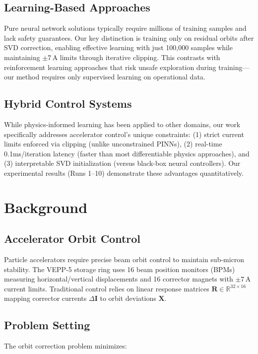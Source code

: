 \documentclass{article} %
\begin{document}
\subsection{Learning-Based Approaches}
Pure neural network solutions \citep{goodfellow2016deep} typically require millions of training samples and lack safety guarantees. Our key distinction is training only on residual orbits after SVD correction, enabling effective learning with just 100,000 samples while maintaining $\pm7$\,A limits through iterative clipping. This contrasts with reinforcement learning approaches that risk unsafe exploration during training---our method requires only supervised learning on operational data.

\subsection{Hybrid Control Systems}
While physics-informed learning \citep{paszke2019pytorch} has been applied to other domains, our work specifically addresses accelerator control's unique constraints: (1) strict current limits enforced via clipping (unlike unconstrained PINNs), (2) real-time 0.1ms/iteration latency (faster than most differentiable physics approaches), and (3) interpretable SVD initialization (versus black-box neural controllers). Our experimental results (Runs 1--10) demonstrate these advantages quantitatively.

\section{Background}
\label{sec:background}

\subsection{Accelerator Orbit Control}
Particle accelerators require precise beam orbit control to maintain sub-micron stability. The VEPP-5 storage ring uses 16 beam position monitors (BPMs) measuring horizontal/vertical displacements and 16 corrector magnets with $\pm7$\,A current limits. Traditional control relies on linear response matrices $\mathbf{R} \in \mathbb{R}^{32 \times 16}$ mapping corrector currents $\Delta\mathbf{I}$ to orbit deviations $\mathbf{X}$.

\subsection{Problem Setting}
The orbit correction problem minimizes:
\end{document}
